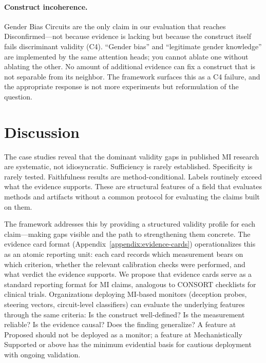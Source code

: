 \documentclass{article}
\begin{document}
\paragraph{Construct incoherence.} Gender Bias Circuits are the only claim in our evaluation that reaches Disconfirmed---not because evidence is lacking but because the construct itself fails discriminant validity (C4). ``Gender bias'' and ``legitimate gender knowledge'' are implemented by the same attention heads; you cannot ablate one without ablating the other. No amount of additional evidence can fix a construct that is not separable from its neighbor. The framework surfaces this as a C4 failure, and the appropriate response is not more experiments but reformulation of the question.

\section{Discussion}
\label{sec:discussion}

The case studies reveal that the dominant validity gaps in published MI research are systematic, not idiosyncratic. Sufficiency is rarely established. Specificity is rarely tested. Faithfulness results are method-conditional. Labels routinely exceed what the evidence supports. These are structural features of a field that evaluates methods and artifacts without a common protocol for evaluating the claims built on them.

The framework addresses this by providing a structured validity profile for each claim---making gaps visible and the path to strengthening them concrete. The evidence card format (Appendix~\ref{appendix:evidence-cards}) operationalizes this as an atomic reporting unit: each card records which measurement bears on which criterion, whether the relevant calibration checks were performed, and what verdict the evidence supports. We propose that evidence cards serve as a standard reporting format for MI claims, analogous to CONSORT checklists for clinical trials. Organizations deploying MI-based monitors (deception probes, steering vectors, circuit-level classifiers) can evaluate the underlying features through the same criteria: Is the construct well-defined? Is the measurement reliable? Is the evidence causal? Does the finding generalize? A feature at Proposed should not be deployed as a monitor; a feature at Mechanistically Supported or above has the minimum evidential basis for cautious deployment with ongoing validation.
\end{document}
